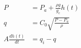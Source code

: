 \begin{equation}
  \begin{aligned}
    P                  & = P_a + \frac{\rho g}{g_c} h(t)
    \\
    q                  & = C_0 \sqrt{\frac{P - P_a}{\rho}}
    \\
    A \frac{dh(t)}{dt} & = q_i - q
  \end{aligned}
  \label{eq:liquid_storage01_2}
\end{equation}